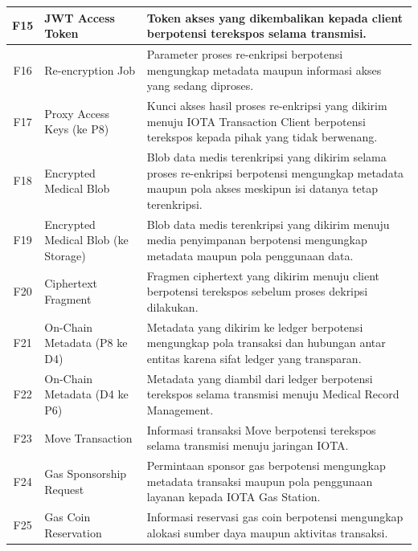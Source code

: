 \begin{xltabular}{\textwidth}{|c|>{\raggedright\arraybackslash}p{3.2cm}|X|}
    F15 &
    JWT Access Token &
    Token akses yang dikembalikan kepada client berpotensi terekspos selama transmisi. \\
    \hline

    F16 &
    Re-encryption Job &
    Parameter proses re-enkripsi berpotensi mengungkap metadata maupun informasi akses yang sedang diproses. \\
    \hline

    F17 &
    Proxy Access Keys (ke P8) &
    Kunci akses hasil proses re-enkripsi yang dikirim menuju IOTA Transaction Client berpotensi terekspos kepada pihak yang tidak berwenang. \\
    \hline

    F18 &
    Encrypted Medical Blob &
    Blob data medis terenkripsi yang dikirim selama proses re-enkripsi berpotensi mengungkap metadata maupun pola akses meskipun isi datanya tetap terenkripsi. \\
    \hline

    F19 &
    Encrypted Medical Blob (ke Storage) &
    Blob data medis terenkripsi yang dikirim menuju media penyimpanan berpotensi mengungkap metadata maupun pola penggunaan data. \\
    \hline

    F20 &
    Ciphertext Fragment &
    Fragmen ciphertext yang dikirim menuju client berpotensi terekspos sebelum proses dekripsi dilakukan. \\
    \hline

    F21 &
    On-Chain Metadata (P8 ke D4) &
    Metadata yang dikirim ke ledger berpotensi mengungkap pola transaksi dan hubungan antar entitas karena sifat ledger yang transparan. \\
    \hline

    F22 &
    On-Chain Metadata (D4 ke P6) &
    Metadata yang diambil dari ledger berpotensi terekspos selama transmisi menuju Medical Record Management. \\
    \hline

    F23 &
    Move Transaction &
    Informasi transaksi Move berpotensi terekspos selama transmisi menuju jaringan IOTA. \\
    \hline

    F24 &
    Gas Sponsorship Request &
    Permintaan sponsor gas berpotensi mengungkap metadata transaksi maupun pola penggunaan layanan kepada IOTA Gas Station. \\
    \hline

    F25 &
    Gas Coin Reservation &
    Informasi reservasi gas coin berpotensi mengungkap alokasi sumber daya maupun aktivitas transaksi. \\
    \hline


\end{xltabular}
